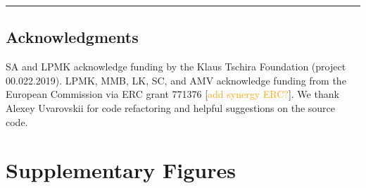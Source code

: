 \documentclass[twocolumn,10pt]{article}
\newcommand{\todo}[1]{[\textcolor{orange}{#1}]}
\begin{document}
\vspace{1.4ex}
\noindent\hfil\rule{.6\columnwidth}{.2pt}\hfil


\subsection{Acknowledgments}

SA and LPMK acknowledge funding by the Klaus Tschira Foundation (project 00.022.2019).
LPMK, MMB, LK, SC, and AMV acknowledge funding from the European Commission via ERC grant 771376 \todo{add synergy ERC?}.
We thank Alexey Uvarovskii for code refactoring and helpful suggestions on the source code.
\bigskip

{
\small \balance  \balance}

\onecolumn 
\newpage
\section{Supplementary Figures}

\setcounter{figure}{0}
\renewcommand{\thefigure}{S\arabic{figure}}
\end{document}
